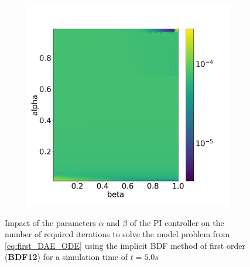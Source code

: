 \documentclass{report}
\begin{document}
\begin{figure}[H]
\begin{subfigure}{0.32\textwidth}
        \label{fig:numberIterationTSBDF12}
    \end{subfigure}
    \begin{subfigure}{0.32\textwidth}
    	\centering
    	\includegraphics[width=1\textwidth]{images/analysis_BDF12_psi.png}
        \label{fig:numberNumericalSchemeBDF12}
    \end{subfigure}
    \caption{Impact of the parameters $\alpha$ and $\beta$ of the PI controller on the number of required iterations to solve the model problem from \autoref{eq:first_DAE_ODE} using the implicit BDF method of first order (\textbf{BDF12}) for a simulation time of $t=5.0s$}
    \label{fig:ParametersPIControllerBDF12}
\end{figure}
\end{document}
